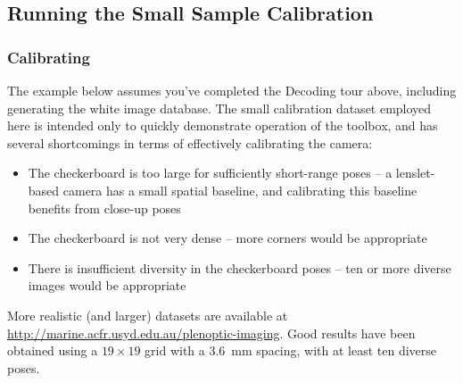 \documentclass[onecolumn]{article}
\begin{document}
\subsection{Running the Small Sample Calibration}
\subsubsection{Calibrating}

The example below assumes you've completed the Decoding tour above, including generating the white image database. The small calibration dataset employed here is intended only to quickly demonstrate operation of the toolbox, and has several shortcomings in terms of effectively calibrating the camera:

\begin{itemize}
\item The checkerboard is too large for sufficiently short-range poses -- a lenslet-based camera has a small spatial baseline, and calibrating this baseline benefits from close-up poses
\item The checkerboard is not very dense -- more corners would be appropriate
\item There is insufficient diversity in the checkerboard poses -- ten or more diverse images would be appropriate
\end{itemize}

More realistic (and larger) datasets are available at \url{http://marine.acfr.usyd.edu.au/plenoptic-imaging}. Good results have been obtained using a $19 \times 19$ grid with a 3.6~mm spacing, with at least ten diverse poses.
\end{document}
